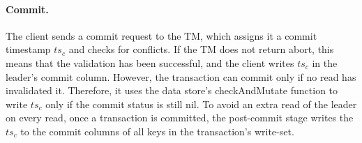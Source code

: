 \paragraph{Commit.}
The client sends a commit request to the TM, which assigns it a commit timestamp $ts_c$ and checks for conflicts. 
If the TM does not return abort, this means that the validation has been successful, and the client writes $ts_c$ in the leader's {commit} column. 
However, the transaction can commit only if no read has invalidated it. Therefore, it uses 
the data store's checkAndMutate function to write $ts_c$ only if the commit status is still nil.
To avoid an extra read of the leader on every read, once a transaction is committed, the post-commit stage writes 
the $ts_c$ to the {commit} columns of all keys in  the transaction's write-set. 

